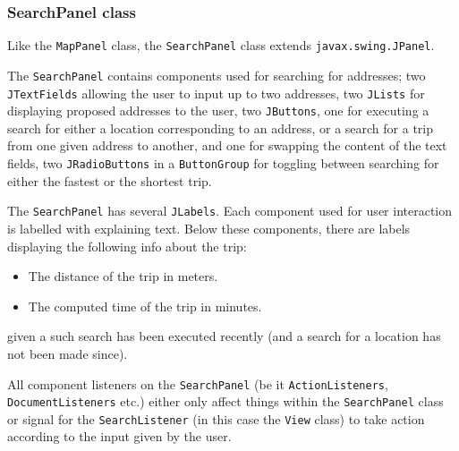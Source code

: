 \subsubsection{SearchPanel class}
Like the \texttt{MapPanel} class, the \texttt{SearchPanel} class extends \texttt{javax.swing.JPanel}.

The \texttt{SearchPanel} contains components used for searching for addresses; two \texttt{JTextFields} allowing the user to input up to two addresses, two \texttt{JLists} for displaying proposed addresses to the user, two \texttt{JButtons}, one for executing a search for either a location corresponding to an address, or a search for a trip from one given address to another, and one for swapping the content of the text fields, two \texttt{JRadioButtons} in a \texttt{ButtonGroup} for toggling between searching for either the fastest or the shortest trip.

The \texttt{SearchPanel} has several \texttt{JLabels}. Each component used for user interaction is labelled with explaining text. Below these components, there are labels displaying the following info about the trip:
\begin{itemize}
 \item The distance of the trip in meters.
 \item The computed time of the trip in minutes.
\end{itemize}
given a such search has been executed recently (and a search for a location has not been made since).

All component listeners on the \texttt{SearchPanel} (be it \texttt{ActionListeners}, \texttt{DocumentListeners} etc.) either only affect things within the \texttt{SearchPanel} class or signal for the \texttt{SearchListener} (in this case the \texttt{View} class) to take action according to the input given by the user.

